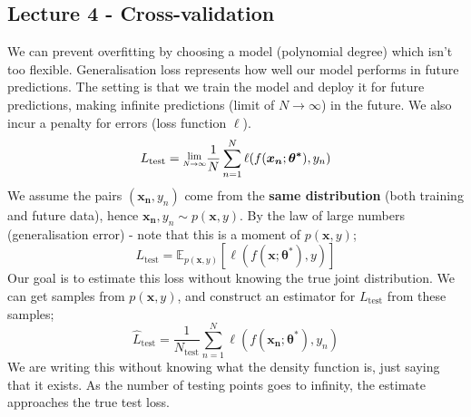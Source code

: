 \documentclass[a4paper, 12pt]{article}
\newcommand{\limit}[2]{\raisebox{0.5ex}{\scalebox{0.8}{$\displaystyle{\lim_{#1 \to #2}}$}}}
\newcommand{\summation}[2]{\sum\limits_{#1}^{#2}}
\renewcommand{\vec}[1]{\boldsymbol{#1}}
\begin{document}
        \subsection*{Lecture 4 - Cross-validation}
            We can prevent overfitting by choosing a model (polynomial degree) which isn't too flexible.
            Generalisation loss represents how well our model performs in future predictions.
            The setting is that we train the model and deploy it for future predictions, making infinite predictions (limit of $N \to \infty$) in the future.
            We also incur a penalty for errors (loss function $\ell$).
            $$L_\text{test} = \limit{N}{\infty} \frac{1}{N} \summation{n = 1}{N} \ell(f(\vec{x_n}; \vec{\theta^*}), y_n)$$
            We assume the pairs $(\vec{x_n}, y_n)$ come from the \textbf{same distribution} (both training and future data), hence $\vec{x_n}, y_n \sim p(\vec{x}, y)$.
            By the law of large numbers (generalisation error) - note that this is a moment of $p(\vec{x}, y)$;
            $$L_\text{test} = \mathbb{E}_{p(\vec{x}, y)}[\ell(f(\vec{x}; \vec{\theta^*}), y)]$$
            Our goal is to estimate this loss without knowing the true joint distribution.
            We can get samples from $p(\vec{x}, y)$, and construct an estimator for $L_\text{test}$ from these samples;
            $$\hat{L}_\text{test} = \frac{1}{N_\text{test}} \summation{n = 1}{N} \ell(f(\vec{x_n}; \vec{\theta^*}), y_n)$$
            We are writing this without knowing what the density function is, just saying that it exists.
            As the number of testing points goes to infinity, the estimate approaches the true test loss.
            \medskip
\end{document}
